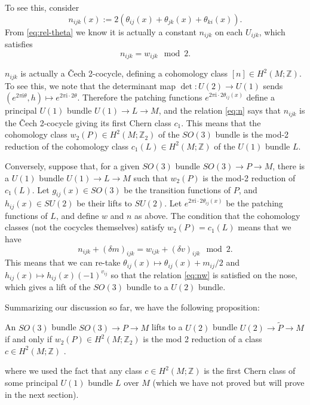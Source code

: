 \documentclass[12pt]{article}
\numberwithin{equation}{section}
\numberwithin{figure}{section}
\theoremstyle{remark}
\def\bZ{\mathbb{Z}}
\def\I{\mathrm{i}}
\begin{document}
To see this, consider \begin{equation}
  n_{ijk}(x):=2(\theta_{ij}(x)+\theta_{jk}(x)+\theta_{ki}(x)).\label{eq:n}
\end{equation}
From \eqref{eq:rel-theta} we know it is actually a constant $n_{ijk}$ on each $U_{ijk}$,
which satisfies \begin{equation}
  n_{ijk} = w_{ijk} \mod 2.\label{eq:nw}
\end{equation}


$n_{ijk}$ is actually a \v Cech 2-cocycle, defining a cohomology class $[n]\in H^2(M;\bZ)$.
To see this, we note that the determinant map $\det:U(2)\to U(1)$ 
sends $(e^{2\pi\I\theta},h)\mapsto e^{2\pi\I\cdot 2\theta}$.
Therefore the patching functions $e^{2\pi\I\cdot 2\theta_{ij}(x)}$ define a principal $U(1)$ bundle $U(1)\to L\to M$,
and the relation \eqref{eq:n} says that $n_{ijk}$ is the \v Cech 2-cocycle 
giving its first Chern class $c_1$.
This means that the cohomology class $w_2(P)\in H^2(M;\bZ_2)$ of the $SO(3)$ bundle 
is the mod-2 reduction of the cohomology class $c_1(L)\in H^2(M;\bZ)$ of the $U(1)$ bundle $L$.

Conversely, suppose that, for a given $SO(3)$ bundle $SO(3)\to P\to M$,
there is a $U(1)$ bundle $U(1)\to L\to M$ 
such that $w_2(P)$ is the mod-2 reduction of $c_1(L)$.
Let $g_{ij}(x)\in SO(3)$ be the transition functions of $P$,
and $h_{ij}(x)\in SU(2)$ be their lifts to $SU(2)$.
Let $e^{2\pi \I \cdot 2\theta_{ij}(x)}$ be the patching functions of $L$,
and define $w$ and $n$ as above.
The condition that the cohomology classes (not the cocycles themselves)
satisfy $w_2(P)=c_1(L)$
 means that we have \begin{equation}
  n_{ijk} +(\delta m)_{ijk}= w_{ijk} +(\delta v)_{ijk} \mod 2.
\end{equation}
This means that we can re-take $\theta_{ij}(x)\mapsto \theta_{ij}(x)+ m_{ij}/2 $ and $h_{ij}(x)\mapsto h_{ij}(x) (-1)^{v_{ij}}$
so that the relation \eqref{eq:nw} is satisfied on the nose,
which gives a lift of the $SO(3)$ bundle to a $U(2)$ bundle.



Summarizing our discussion so far, we have the following proposition:
\begin{proposition}
  An $SO(3)$ bundle $SO(3)\to P\to M$
  lifts to a $U(2)$ bundle $U(2)\to \tilde P\to M$ if and only if
   $w_2(P)\in H^2(M;\bZ_2)$ is 
  the mod 2 reduction of a class $c\in H^2(M;\bZ)$ .
\end{proposition}
where we used the fact that any class $c\in H^2(M;\bZ)$ is
the first Chern class of some principal $U(1)$ bundle $L$ over $M$ 
(which we have not proved but will prove in the next section).
\end{document}
